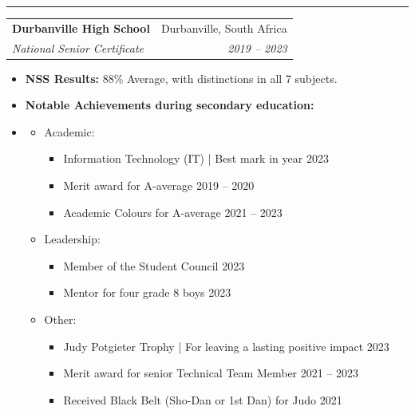 \documentclass[11pt,a4paper]{article}
\makeatletter
\newcommand{\cvEntry}[4]{
  \noindent\vspace{2pt}\begin{tabular*}{1\textwidth}[t]{l@{\extracolsep{\fill}}r}
    \textbf{#1} & #2 \\
    \textit{\small#3} & \textit{\small #4} \\
  \end{tabular*}\vspace{0pt}
}
\makeatother
\begin{document}
  \vspace{5px} \hrule \vspace{5px}

  \cvEntry
    {Durbanville High School}{Durbanville, South Africa}
    {National Senior Certificate}{2019 -- 2023}
    \begin{itemize}[label={}, noitemsep]
      \small
      \item \textbf{NSS Results:} 88\% Average, with distinctions in all 7 subjects.
      \item \textbf{Notable Achievements during secondary education:}
      \item \begin{itemize}[leftmargin=2em, noitemsep, label={\textbullet}]
        \item Academic:
          \begin{itemize}[leftmargin=1em, font=\normalfont, noitemsep, label={-}]
            \item Information Technology (IT) | Best mark in year \hfill 2023
            \item Merit award for A-average \hfill 2019 -- 2020
            \item Academic Colours for A-average \hfill 2021 -- 2023
          \end{itemize}
        \item Leadership:
          \begin{itemize}[leftmargin=1em, font=\normalfont, noitemsep, label={-}]
            \item Member of the Student Council \hfill 2023
            \item Mentor for four grade 8 boys \hfill 2023
          \end{itemize}
        \item Other:
          \begin{itemize}[leftmargin=1em, font=\normalfont, noitemsep, label={-}]
            \item Judy Potgieter Trophy | For leaving a lasting positive impact \hfill 2023
            \item Merit award for senior Technical Team Member \hfill 2021 -- 2023
            \item Received Black Belt (Sho-Dan or 1st Dan) for Judo \hfill 2021
          \end{itemize}
      \end{itemize}
    \end{itemize}
\end{document}

